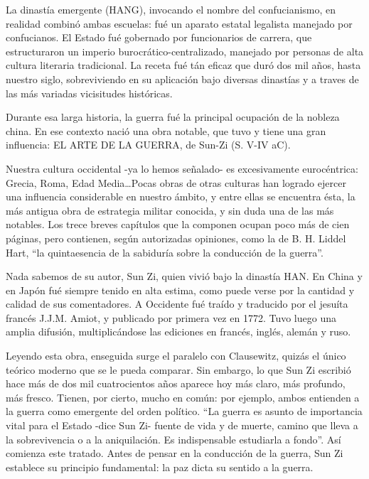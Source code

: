 \documentclass[
]{book}
\begin{document}
La dinastía emergente (HANG), invocando el nombre del confucianismo, en realidad combinó ambas escuelas: fué un aparato estatal legalista manejado por confucianos. El Estado fué gobernado por funcionarios de carrera, que estructuraron un imperio burocrático-centralizado, manejado por personas de alta cultura literaria tradicional. La receta fué tán eficaz que duró dos mil años, hasta nuestro siglo, sobreviviendo en su aplicación bajo diversas dinastías y a traves de las más variadas vicisitudes históricas.

Durante esa larga historia, la guerra fué la principal ocupación de la nobleza china. En ese contexto nació una obra notable, que tuvo y tiene una gran influencia: EL ARTE DE LA GUERRA, de Sun-Zi (S. V-IV aC).

Nuestra cultura occidental -ya lo hemos señalado- es excesivamente eurocéntrica: Grecia, Roma, Edad Media\ldots Pocas obras de otras culturas han logrado ejercer una influencia considerable en nuestro ámbito, y entre ellas se encuentra ésta, la más antigua obra de estrategia militar conocida, y sin duda una de las más notables. Los trece breves capítulos que la componen ocupan poco más de cien páginas, pero contienen, según autorizadas opiniones, como la de B. H. Liddel Hart, ``la quintaesencia de la sabiduría sobre la conducción de la guerra''.

Nada sabemos de su autor, Sun Zi, quien vivió bajo la dinastía HAN. En China y en Japón fué siempre tenido en alta estima, como puede verse por la cantidad y calidad de sus comentadores. A Occidente fué traído y traducido por el jesuíta francés J.J.M. Amiot, y publicado por primera vez en 1772. Tuvo luego una amplia difusión, multiplicándose las ediciones en francés, inglés, alemán y ruso.

Leyendo esta obra, enseguida surge el paralelo con Clausewitz, quizás el único teórico moderno que se le pueda comparar. Sin embargo, lo que Sun Zi escribió hace más de dos mil cuatrocientos años aparece hoy más claro, más profundo, más fresco. Tienen, por cierto, mucho en común: por ejemplo, ambos entienden a la guerra como emergente del orden político. ``La guerra es asunto de importancia vital para el Estado -dice Sun Zi- fuente de vida y de muerte, camino que lleva a la sobrevivencia o a la aniquilación. Es indispensable estudiarla a fondo''. Así comienza este tratado. Antes de pensar en la conducción de la guerra, Sun Zi establece su principio fundamental: la paz dicta su sentido a la guerra.
\end{document}
